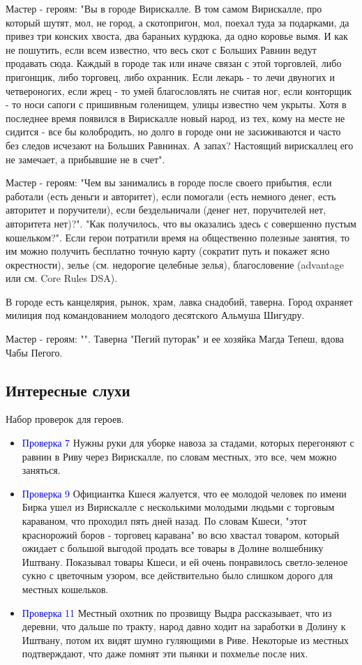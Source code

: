 \documentclass[twoside,twocolumn]{article}
\begin{document}
Мастер - героям: 
"Вы в городе Вирискалле. В том самом Вирискалле, про который шутят, мол, не город, а скотопригон, мол, поехал туда за подарками, да привез три конских хвоста, два бараньих курдюка, да одно коровье вымя. И как не пошутить, если всем известно, что весь скот с Больших Равнин ведут продавать сюда. Каждый в городе так или иначе связан с этой торговлей, либо пригонщик, либо торговец, либо охранник. Если лекарь - то лечи двуногих и четвероногих, если жрец - то умей благословлять не считая ног, если конторщик - то носи сапоги с пришивным голенищем, улицы известно чем укрыты. Хотя в последнее время появился в Вирискалле новый народ, из тех, кому на месте не сидится - все бы колобродить, но долго в городе они не засиживаются и часто без следов исчезают на Больших Равнинах. А запах? Настоящий вирискаллец его не замечает, а прибывшие не в счет".

Мастер - героям: 
"Чем вы занимались в городе после своего прибытия, если работали (есть деньги и авторитет), если помогали (есть немного денег, есть авторитет и поручители), если бездельничали (денег нет, поручителей нет, авторитета нет)?". "Как получилось, что вы оказались здесь с совершенно пустым кошельком?". Если герои потратили время на общественно полезные занятия, то им можно получить бесплатно точную карту (сократит путь и покажет ясно окрестности), зелье (см. недорогие целебные зелья), благословение (advantage или см. Core Rules DSA).

В городе есть канцелярия, рынок, храм, лавка снадобий, таверна. Город охраняет милиция под командованием молодого десятского Альмуша Шигудру. 

Мастер - героям: "".
Таверна "Пегий путорак" и ее хозяйка Магда Тепеш, вдова Чабы Пегого.

\subsection{Интересные слухи}
Набор проверок для героев.
\begin{itemize}
\item \textcolor{blue}{Проверка 7} Нужны руки для уборке навоза за стадами, которых перегоняют с равнин в Риву через Вирискалле, по словам местных, это все, чем можно заняться.
\item \textcolor{blue}{Проверка 9} Официантка Кшеся жалуется, что ее молодой человек по имени Бирка ушел из Вирискалле с несколькими молодыми людьми с торговым караваном, что проходил пять дней назад. По словам Кшеси, "этот краснорожий боров - торговец каравана" во всю хвастал товаром, который ожидает с большой выгодой продать все товары в Долине волшебнику Иштвану. Показывал товары Кшеси, и ей очень понравилось светло-зеленое сукно с цветочным узором, все действительно было слишком дорого для местных кошельков.
\item \textcolor{blue}{Проверка 11} Местный охотник по прозвищу Выдра рассказывает, что из деревни, что дальше по тракту, народ давно ходит на заработки в Долину к Иштвану, потом их видят шумно гуляющими в Риве. Некоторые из местных подтверждают, что даже помнят эти пьянки и похмелье после них. 
\end{itemize}
\end{document}
